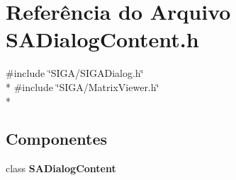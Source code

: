 \section{Referência do Arquivo S\+A\+Dialog\+Content.\+h}
\label{_s_a_dialog_content_8h}
{\ttfamily \#include \char`\"{}S\+I\+G\+A/\+S\+I\+G\+A\+Dialog.\+h\char`\"{}}\\*
{\ttfamily \#include \char`\"{}S\+I\+G\+A/\+Matrix\+Viewer.\+h\char`\"{}}\\*
\subsection*{Componentes}
\begin{DoxyCompactItemize}
\item 
class {\bf S\+A\+Dialog\+Content}
\end{DoxyCompactItemize}
